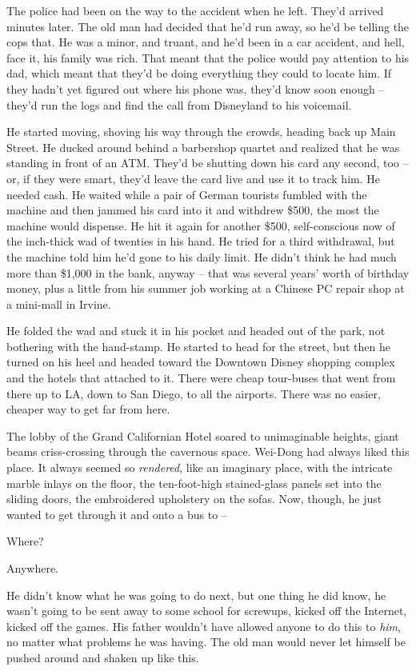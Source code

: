 The police had been on the way to the accident when he left. They'd
arrived minutes later. The old man had decided that he'd run away,
so he'd be telling the cops that. He was a minor, and truant, and
he'd been in a car accident, and hell, face it, his family was
rich. That meant that the police would pay attention to his dad,
which meant that they'd be doing everything they could to locate
him. If they hadn't yet figured out where his phone was, they'd
know soon enough -- they'd run the logs and find the call from
Disneyland to his voicemail.

He started moving, shoving his way through the crowds, heading back
up Main Street. He ducked around behind a barbershop quartet and
realized that he was standing in front of an ATM. They'd be
shutting down his card any second, too -- or, if they were smart,
they'd leave the card live and use it to track him. He needed cash.
He waited while a pair of German tourists fumbled with the machine
and then jammed his card into it and withdrew \$500, the most the
machine would dispense. He hit it again for another \$500,
self-conscious now of the inch-thick wad of twenties in his hand.
He tried for a third withdrawal, but the machine told him he'd gone
to his daily limit. He didn't think he had much more than \$1,000
in the bank, anyway -- that was several years' worth of birthday
money, plus a little from his summer job working at a Chinese PC
repair shop at a mini-mall in Irvine.

He folded the wad and stuck it in his pocket and headed out of the
park, not bothering with the hand-stamp. He started to head for the
street, but then he turned on his heel and headed toward the
Downtown Disney shopping complex and the hotels that attached to
it. There were cheap tour-buses that went from there up to LA, down
to San Diego, to all the airports. There was no easier, cheaper way
to get far from here.

The lobby of the Grand Californian Hotel soared to unimaginable
heights, giant beams criss-crossing through the cavernous space.
Wei-Dong had always liked this place. It always seemed so
\emph{rendered}, like an imaginary place, with the intricate marble
inlays on the floor, the ten-foot-high stained-glass panels set
into the sliding doors, the embroidered upholstery on the sofas.
Now, though, he just wanted to get through it and onto a bus to --

Where?

Anywhere.

He didn't know what he was going to do next, but one thing he did
know, he wasn't going to be sent away to some school for screwups,
kicked off the Internet, kicked off the games. His father wouldn't
have allowed anyone to do this to \emph{him}, no matter what
problems he was having. The old man would never let himself be
pushed around and shaken up like this.

